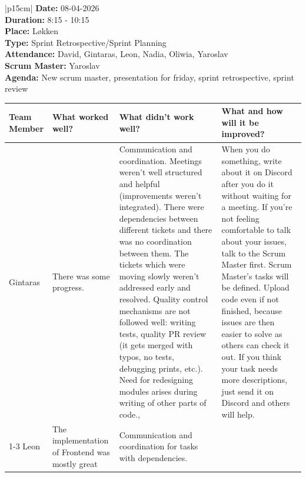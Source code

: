 \begin{table}[H]
    \centering
    \begin{tabular}{|p{15cm}|}   
        \hline
        \textbf{Date:}  08-04-2026 \\
        \textbf{Duration:} 8:15 - 10:15\\
        \textbf{Place:}  Løkken \\
        \textbf{Type:} Sprint Retrospective/Sprint Planning \\
        \textbf{Attendance:} David, Gintaras, Leon, Nadia, Oliwia, Yaroslav \\
        \textbf{Scrum Master:} Yaroslav \\
        \textbf{Agenda:} New scrum master, presentation for friday, sprint retrospective, sprint review 
        \begin{table}[H]
            \begin{tabular}{|p{1.75cm}|p{4cm}|p{4cm}|p{4cm}|}
                \hline
                \cellcolor[HTML]{BFBFBF}  \textbf{Team Member} & \cellcolor[HTML]{BFBFBF} \textbf{What worked well?} & \cellcolor[HTML]{BFBFBF}  \textbf{What didn’t work well?} & \cellcolor[HTML]{BFBFBF}  \textbf{What and how will it be improved?}\\
                \hline
                \cellcolor[HTML]{d4d4d4} Gintaras & There was some progress. & Communication and coordination. Meetings weren't well structured and helpful (improvements weren't integrated). There were dependencies between different tickets and there was no coordination between them. The tickets which were moving slowly weren't addressed early and resolved. Quality control mechanisms are not followed well: writing tests, quality PR review (it gets merged with typos, no tests, debugging prints, etc.). Need for redesigning modules arises during writing of other parts of code., & When you do something, write about it on Discord after you do it without waiting for a meeting. \newline \newline If you’re not feeling comfortable to talk about your issues, talk to the Scrum Master first. \newline \newline Scrum Master’s tasks will be defined. \newline \newline Upload code even if not finished, because issues are then easier to solve as others can check it out. \newline \newline If you think your task needs more descriptions, just send it on Discord and others will help. \\
                \cline{1-3}
                \cellcolor[HTML]{d4d4d4} Leon & The implementation of Frontend was mostly great & Communication and coordination for tasks with dependencies. &  \\
                \hline
            \end{tabular}
        \end{table}
        \\
        \hline
    \end{tabular}
\end{table}

